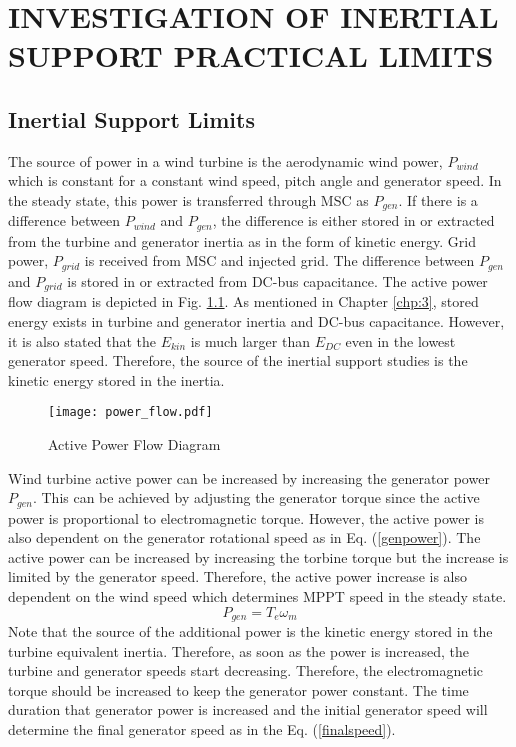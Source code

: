 \chapter{INVESTIGATION OF INERTIAL SUPPORT PRACTICAL LIMITS}
\label{chp:4}
\section{Inertial Support Limits}
The source of power in a wind turbine is the aerodynamic wind power, $P_{wind}$ which is constant for a constant wind speed, pitch angle and generator speed. In the steady state, this power is transferred through MSC as $P_{gen}$. If there is a difference between $P_{wind}$ and $P_{gen}$, the difference is either stored in or extracted from the turbine and generator inertia as in the form of kinetic energy. Grid power, $P_{grid}$ is received from MSC and injected grid. The difference between $P_{gen}$ and $P_{grid}$ is stored in or extracted from DC-bus capacitance. The active power flow diagram is depicted in Fig. \ref{power_flow}. As mentioned in Chapter \ref{chp:3}, stored energy exists in turbine and generator inertia and DC-bus capacitance. However, it is also stated that the $E_{kin}$ is much larger than $E_{DC}$ even in the lowest generator speed. Therefore, the source of the inertial support studies is the kinetic energy stored in the inertia. \par
\begin{figure}[h!]
	\centering
	\texttt{[image: power\_flow.pdf]}
	\caption{Active Power Flow Diagram}
	\label{power_flow}
\end{figure}
Wind turbine active power can be increased by increasing the generator power $P_{gen}$. This can be achieved by adjusting the generator torque since the active power is proportional to electromagnetic torque. However, the active power is also dependent on the generator rotational speed as in Eq. (\ref{genpower}). The active power can be increased by increasing the torbine torque but the increase is limited by the generator speed. Therefore, the active power increase is also dependent on the wind speed which determines MPPT speed in the steady state.
\begin{equation}
P_{gen}=T_{e} \omega_{m}
\label{genpower}
\end{equation}
Note that the source of the additional power is the kinetic energy stored in the turbine equivalent inertia. Therefore, as soon as the power is increased, the turbine and generator speeds start decreasing. Therefore, the electromagnetic torque should be increased to keep the generator power constant. The time duration that generator power is increased and the initial generator speed will determine the final generator speed as in the Eq. (\ref{finalspeed}).
